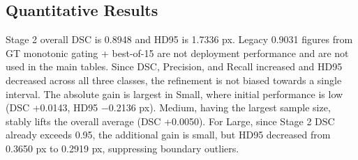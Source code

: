 \documentclass[11pt,a4paper]{article}
\begin{document}
\subsection{Quantitative Results}

\begin{table}[htbp]
    \centering
    \caption{Performance before (Init) and after (Final) Stage 3$\cdot$4 refinement on BraTS 2021 validation set (42 patients, 2,434 slices). Main reported values are Stage 2; deploy Stage 3 pending remeasurement.}
    \label{tab:quantitative}
\end{table}

Stage 2 overall DSC is 0.8948 and HD95 is 1.7336 px. Legacy 0.9031 figures from GT monotonic gating + best-of-15 are not deployment performance and are not used in the main tables. Since DSC, Precision, and Recall increased and HD95 decreased across all three classes, the refinement is not biased towards a single interval. The absolute gain is largest in Small, where initial performance is low (DSC +0.0143, HD95 $-$0.2136 px). Medium, having the largest sample size, stably lifts the overall average (DSC +0.0050). For Large, since Stage 2 DSC already exceeds 0.95, the additional gain is small, but HD95 decreased from 0.3650 px to 0.2919 px, suppressing boundary outliers.
\end{document}
